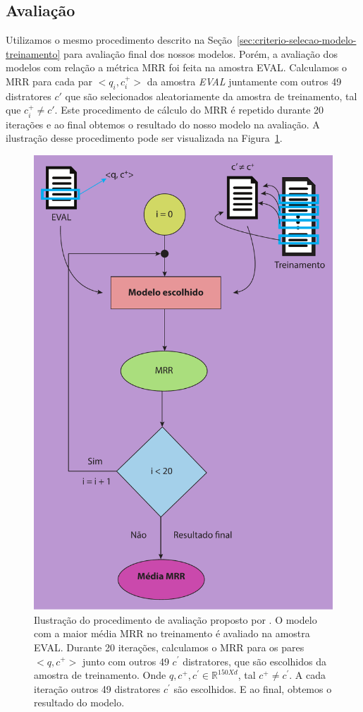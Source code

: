 \subsection{Avaliação}
\label{sec:avaliacao}

Utilizamos o mesmo procedimento descrito na Seção~\ref{sec:criterio-selecao-modelo-treinamento} para avaliação final dos nossos modelos. Porém, a avaliação dos modelos com relação a métrica MRR foi feita na amostra EVAL. Calculamos o MRR para cada par $<q_{i}, c_{i}^{+}>$ da amostra \emph{EVAL} juntamente com outros 49 distratores $c'$ que são selecionados aleatoriamente da amostra de treinamento, tal que $c_{i}^{+} \neq c'$. Este procedimento de cálculo do MRR é repetido durante 20 iterações e ao final obtemos o resultado do nosso modelo na avaliação. A ilustração desse procedimento pode ser visualizada na Figura~\ref{fig:final-evaluation-process}.

\begin{figure}[h]
\centering
\includegraphics[height=1\textwidth]{figuras/cap-experimento/final_evaluation_process.pdf}
\caption{Ilustração do procedimento de avaliação proposto por \cite{iyer-etal-2016-summarizing}. O modelo com a maior média MRR no treinamento é avaliado na amostra EVAL. Durante 20 iterações, calculamos o MRR para os pares $<q, c^{+}>$ junto com outros 49 $c^{'}$ distratores, que são escolhidos da amostra de treinamento. Onde $q, c^{+}, c^{'} \in \mathbb{R}^{150 X d}$, tal $c^{+} \neq c^{'}$. A cada iteração outros 49 distratores $c^{'}$ são escolhidos. E ao final, obtemos o resultado do modelo.}
\label{fig:final-evaluation-process}
\end{figure}



